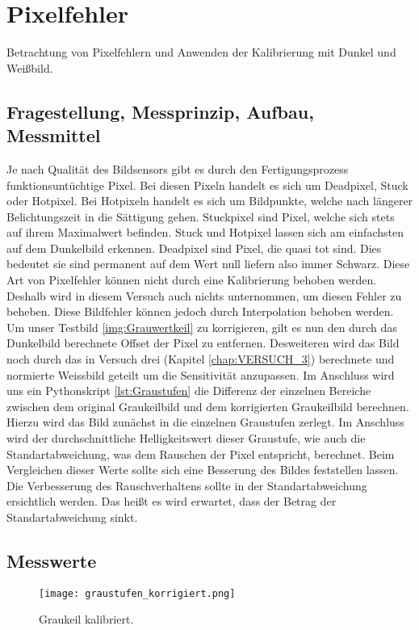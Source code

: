 %
%
\chapter{Pixelfehler}
Betrachtung von Pixelfehlern und Anwenden der Kalibrierung mit Dunkel und Weißbild.
\label{chap:Pixelfehler}

\section{Fragestellung, Messprinzip, Aufbau, Messmittel}
Je nach Qualität des Bildsensors gibt es durch den Fertigungsprozess funktionsuntüchtige Pixel. Bei diesen Pixeln handelt es sich um Deadpixel, Stuck oder Hotpixel. Bei Hotpixeln handelt es sich um Bildpunkte, welche nach längerer Belichtungszeit in die Sättigung gehen. Stuckpixel sind Pixel, welche sich stets auf ihrem Maximalwert befinden. Stuck und Hotpixel lassen sich am einfachsten auf dem Dunkelbild erkennen. Deadpixel sind Pixel, die quasi tot sind. Dies bedeutet sie sind permanent auf dem Wert null liefern also immer Schwarz. Diese Art von Pixelfehler können nicht durch eine Kalibrierung behoben werden. Deshalb wird in diesem Versuch auch nichts unternommen, um diesen Fehler zu beheben. Diese Bildfehler können jedoch durch Interpolation behoben werden.
Um unser Testbild \ref{img:Grauwertkeil} zu korrigieren, gilt es nun den durch das Dunkelbild berechnete Offset der Pixel zu entfernen. Desweiteren wird das Bild noch durch das in Versuch drei (Kapitel \ref{chap:VERSUCH_3}) berechnete und normierte Weissbild geteilt um die Sensitivität anzupassen.
Im Anschluss wird uns ein Pythonskript \ref{lst:Graustufen} die Differenz der einzelnen Bereiche zwischen dem original Graukeilbild und dem korrigierten Graukeilbild berechnen. Hierzu wird das Bild zunächst in die einzelnen Graustufen zerlegt. Im Anschluss wird der durchschnittliche Helligkeitswert dieser Graustufe, wie auch die Standartabweichung, was dem Rauschen der Pixel entspricht, berechnet. 
Beim Vergleichen dieser Werte sollte sich eine Besserung des Bildes feststellen lassen. Die Verbesserung des Rauschverhaltens sollte in der Standartabweichung ersichtlich werden. Das heißt es wird erwartet, dass der Betrag der Standartabweichung sinkt. 
\label{chap:VERSUCH_4_FRAGESTELLUNG}

\section{Messwerte}
\begin{figure}[H]
\centering
\texttt{[image: graustufen\_korrigiert.png]}
\caption{Graukeil kalibriert.}
\label{img:Graukeil_korrigiert}
\end{figure}


